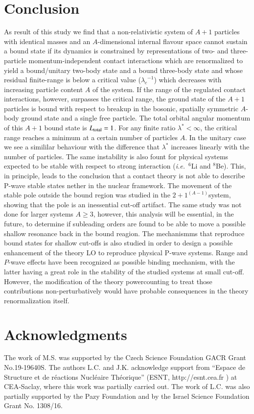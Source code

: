 \documentclass[preprint,12pt]{elsarticle}
\newcommand{\lc}{\ensuremath{\lambda_c}}
\newcommand{\abb}{\ensuremath{2\!+\!1^{(A-1)}}}
\newcommand{\ie}{\textit{i.e.}~}
\begin{document}
\section{Conclusion}
As result of this study we find that a non-relativistic system of $A+1$ particles with identical masses and an $A$-dimensional internal flavour space cannot sustain a bound state if its dynamics is constrained by representations of two- and three-particle momentum-independent contact interactions which are renormalized to yield a bound/unitary two-body state and a bound three-body state and whose residual finite-range is below a critical value ($\lc^{-1}$) which decreases with increasing particle content $A$ of the system.
If the range of the regulated contact interactions, however, surpasses the critical range, the ground state of the $A+1$ particles is bound with respect to breakup in the bosonic, spatially symmetric $A$-body ground state and a single free particle.
The total orbital angular momentum of this $A+1$ bound state is $L_{\text{\scriptsize total}} = 1$.
For any finite ratio $\lambda^*<\infty$, the critical range reaches a minimum at a certain number of particles $A$.
In the unitary case we see a simililar behaviour with the difference that $\lambda^*$ increases linearly with the number of particles.
The same instability is also fount for physical systems expected to be stable with respect to strong interaction (\ie $^6$Li and $^8$Be). 
This, in principle, leads to the conclusion that a contact theory is not able to describe P-wave stable states nether in the nuclear framework. 
The movement of the stable pole outside the bound region was studied in the \abb system, showing that the pole is an inessential cut-off artifact.
The same study was not done for larger systems $A \geq 3$, however, this analysis will be essential, in the future, to determine if subleading orders are found to be able to move a possible shallow resonance back in the bound reagion.
The mechanismms that reproduce bound states for shallow cut-offs is also studied in order to design a possible enhancement of the theory LO to reproduce physical P-wave systems.
Range and $P$-wave effects have been recognized as possible binding mechanism, with the latter having a great role in the stability of the studied systems at small cut-off.
However, the modification of the theory powercounting to treat those contributions non-perturbatively would have probable consequences in the theory renormalization itself.





\section*{Acknowledgments}
The work of M.S. was supported by the Czech Science Foundation GACR Grant No.19-19640S.
The authors L.C. and J.K. acknowledge support from “Espace de Structure et de réactions Nucléaire Théorique” (ESNT, http://esnt.cea.fr ) at CEA-Saclay, where this work was partially carried out.
The work of L.C. was also partially supported by the Pazy Foundation and by the Israel Science Foundation Grant No. 1308/16.



%
\end{document}
